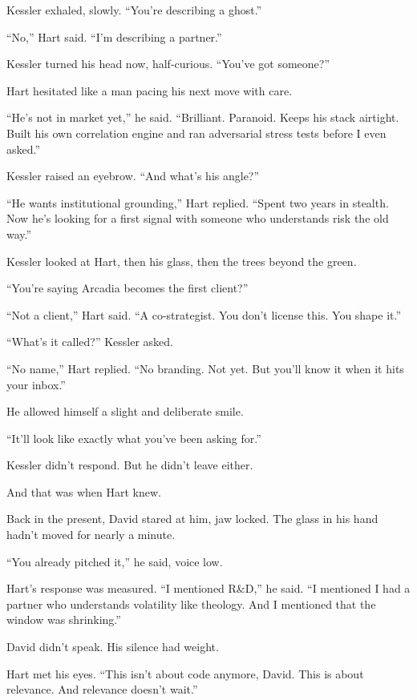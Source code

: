 Kessler exhaled, slowly. “You’re describing a ghost.”

“No,” Hart said. “I’m describing a partner.”

Kessler turned his head now, half-curious. “You’ve got someone?”

Hart hesitated like a man pacing his next move with care.

“He’s not in market yet,” he said. “Brilliant. Paranoid. Keeps his stack airtight. Built his own correlation 
engine and ran adversarial stress tests before I even asked.”

Kessler raised an eyebrow. “And what’s his angle?”

“He wants institutional grounding,” Hart replied. “Spent two years in stealth. Now he’s looking for a first 
signal with someone who understands risk the old way.”

Kessler looked at Hart, then his glass, then the trees beyond the green. 

“You’re saying Arcadia becomes the first client?”

“Not a client,” Hart said. “A co-strategist. You don’t license this. You shape it.”

“What’s it called?” Kessler asked.

“No name,” Hart replied. “No branding. Not yet. But you’ll know it when it hits your inbox.”

He allowed himself a slight and deliberate smile.

“It’ll look like exactly what you’ve been asking for.”

Kessler didn’t respond. But he didn’t leave either.

And that was when Hart knew.

Back in the present, David stared at him, jaw locked. The glass in his hand hadn’t moved for nearly a minute.

“You already pitched it,” he said, voice low.

Hart’s response was measured. “I mentioned R\&D,” he said. “I mentioned I had a partner who understands 
volatility like theology. And I mentioned that the window was shrinking.”

David didn’t speak. His silence had weight.

Hart met his eyes. “This isn’t about code anymore, David. This is about relevance. And relevance doesn’t wait.”

\medskip

